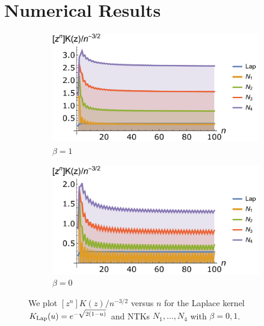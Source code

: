 \documentclass[11pt]{article}
\newcommand{\klap}{K_{\textnormal{Lap}}}
\begin{document}
\section{Numerical Results}
\begin{figure}[htb]
    \centering
    \begin{subfigure}[b]{.46\linewidth}
    \includegraphics[width=\linewidth]{pix/coeff.pdf}
    \caption{$\beta=1$}
    \end{subfigure}
    \begin{subfigure}[b]{.46\linewidth}
    \includegraphics[width=\linewidth]{pix/coeff0.pdf}
    \caption{$\beta=0$}
    \end{subfigure}
    \caption{We plot $[z^n]K(z)/n^{-3/2}$ versus $n$ for the Laplace kernel $\klap(u) = e^{-\sqrt{2(1-u)}}$ and NTKs $N_1,\dots,N_4$ with $\beta=0,1$. }
    \label{fig:coeff}
\end{figure}
\end{document}
